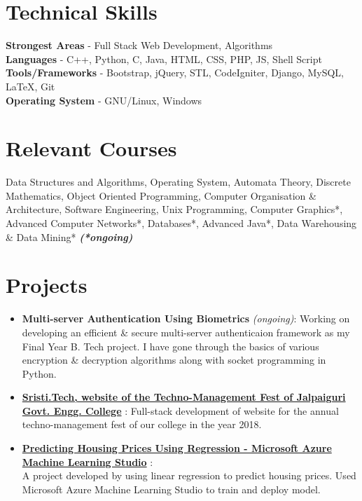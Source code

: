 \documentclass[margin, centered]{res}
\begin{document}
\begin{resume}
\section{Technical \hspace{2mm} Skills}
\textbf{Strongest Areas} - Full Stack Web Development, Algorithms\\
\textbf{Languages} - C++, Python, C, Java, HTML, CSS, PHP, JS, Shell Script\\
\textbf{Tools/Frameworks} - Bootstrap, jQuery, STL, CodeIgniter, Django, MySQL, \LaTeX, Git\\
\textbf{Operating System} - GNU/Linux, Windows

\section{Relevant \hspace{2mm} Courses}
Data Structures and Algorithms, Operating System, Automata Theory, Discrete Mathematics, Object Oriented Programming, Computer Organisation \& Architecture, Software Engineering, Unix Programming, Computer Graphics*, Advanced Computer Networks*, Databases*, Advanced Java*, Data Warehousing \& Data Mining* \hfill
\textbf{\textit{(*ongoing)}}

\section{Projects}
\begin{itemize}[leftmargin=*]
\item
\textbf{Multi-server Authentication Using Biometrics} \textit{(ongoing)}: Working on developing an efficient \& secure multi-server authenticaion framework as my Final Year B. Tech project. I have gone through the basics of various encryption \& decryption algorithms along with socket programming in Python.
\item
\textbf{\href{http://sristi.tech}{Sristi.Tech, website of the Techno-Management Fest of Jalpaiguri Govt. Engg. College}} : Full-stack development of website for the annual techno-management fest of our college in the year 2018.
 \item \textbf{\href{https://gallery.cortanaintelligence.com/Experiment/Prediction-of-Housing-Prices-1}{Predicting Housing Prices Using Regression - Microsoft Azure Machine Learning Studio}} :\\
 A project developed by using linear regression to predict housing prices. Used Microsoft Azure Machine Learning Studio to train and deploy model.
 

\end{itemize}
\end{resume}
\end{document}

